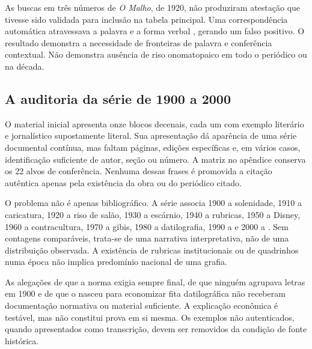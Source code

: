 As buscas em três números de \textit{O Malho}, de 1920, não produziram atestação que tivesse sido validada para inclusão na tabela principal. Uma correspondência automática atravessava a palavra  e a forma verbal , gerando um falso positivo. O resultado demonstra a necessidade de fronteiras de palavra e conferência contextual. Não demonstra ausência de riso onomatopaico em todo o periódico ou na década.

\subsection{A auditoria da série de 1900 a 2000}
O material inicial apresenta onze blocos decenais, cada um com exemplo literário e jornalístico supostamente literal. Sua apresentação dá aparência de uma série documental contínua, mas faltam páginas, edições específicas e, em vários casos, identificação suficiente de autor, seção ou número. A matriz no apêndice conserva os 22 alvos de conferência. Nenhuma dessas frases é promovida a citação autêntica apenas pela existência da obra ou do periódico citado.

O problema não é apenas bibliográfico. A série associa 1900 a solenidade, 1910 a caricatura, 1920 a riso de salão, 1930 a escárnio, 1940 a rubricas, 1950 a Disney, 1960 a contracultura, 1970 a gibis, 1980 a datilografia, 1990 a  e 2000 a . Sem contagens comparáveis, trata-se de uma narrativa interpretativa, não de uma distribuição observada. A existência de rubricas institucionais ou de quadrinhos numa época não implica predomínio nacional de uma grafia.

As alegações de que a norma exigia sempre  final, de que ninguém agrupava letras em 1900 e de que o  nasceu para economizar fita datilográfica não receberam documentação normativa ou material suficiente. A explicação econômica é testável, mas não constitui prova em si mesma. Os exemplos não autenticados, quando apresentados como transcrição, devem ser removidos da condição de fonte histórica.


